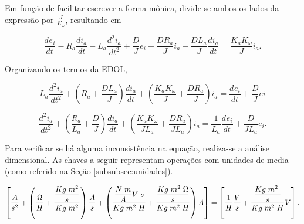 \documentclass{article}
\numberwithin{equation}{section}
\newcommand{\dei}[1]{\dfrac{d^{#1}e_i}{dt^{#1}}}
\let\l\left
\let\r\right
\let\dfr\dfrac
\begin{document}
\noindent Em função de facilitar escrever a forma mônica, divide-se ambos os lados da expressão por $\frac{J}{K_{\omega}}$, resultando em

\begin{equation*}
    \dei{ } - R_a\dfr{di_a}{dt} - L_a\dfr{d^2i_a}{dt^2} + \dfr{D}{J} e_i - \dfr{D R_a}{J} i_a - \dfr{D L_a}{J} \dfr{di_a}{dt} = \dfr{K_a K_{\omega}}{J} i_a.
\end{equation*}

\noindent Organizando os termos da EDOL,

\begin{equation*}
    L_a \dfr{d^2i_a}{dt^2} + \l(R_a + \dfr{D L_a}{J}\r)\dfr{di_a}{dt} + \l(\dfr{K_a K_{\omega}}{J} + \dfr{D R_a}{J}\r)i_a = \dei{ } + \dfr{D}{J} ei
\end{equation*}

\begin{equation}
    \dfr{d^2i_a}{dt^2} + \l(\dfr{R_a}{L_a} + \dfr{D}{J}\r)\dfr{di_a}{dt} + \l(\dfr{K_a K_{\omega}}{J L_a} + \dfr{D R_a}{J L_a}\r)i_a = \dfr{1}{L_a}\dei{ } + \dfr{D}{J L_a} e_i. \label{eq:e1_edol_monica}
\end{equation}

\noindent Para verificar se há alguma inconsistência na equação, realiza-se a análise dimensional. As chaves a seguir representam operações com unidades de media (como referido na Seção \ref{subsubsec:unidades}).

\begin{equation*}
    \l[ \dfr{A}{s^2} + \l( \dfr{\Omega}{H} + \dfr{\dfr{Kg \hspace{1mm} m^2}{s}}{Kg \hspace{1mm} m^2} \r) \dfr{A}{s} + \l( \dfr{\dfr{N \hspace{1mm} m}{A} V \hspace{1mm} s}{Kg \hspace{1mm} m^2 \hspace{1mm} H} + \dfr{\dfr{Kg \hspace{1mm} m^2 \hspace{1mm} \Omega}{s}}{Kg \hspace{1mm} m^2 \hspace{1mm} H} \r)A \r] = \l[ \dfr{1}{H}\dfr{V}{s}  + \dfr{\dfr{Kg \hspace{1mm} m^2 \hspace{1mm}}{s}}{Kg \hspace{1mm} m^2 \hspace{1mm} H}V\r].
\end{equation*}
\end{document}
